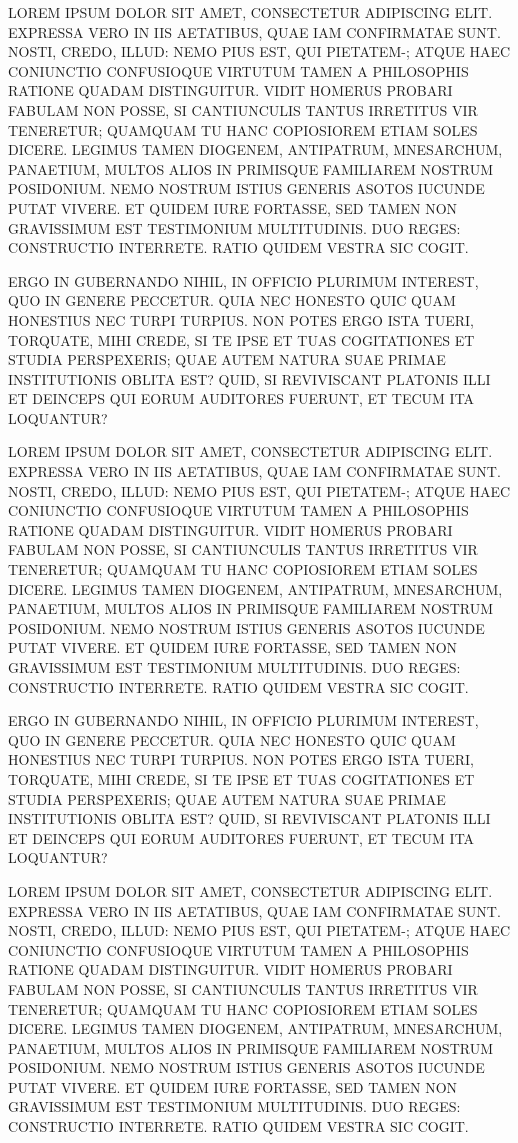 \documentclass[letterpaper]{article}
\begin{document}
LOREM IPSUM DOLOR SIT AMET, CONSECTETUR ADIPISCING ELIT. EXPRESSA VERO IN IIS AETATIBUS, QUAE IAM CONFIRMATAE SUNT. NOSTI, CREDO, ILLUD: NEMO PIUS EST, QUI PIETATEM-; ATQUE HAEC CONIUNCTIO CONFUSIOQUE VIRTUTUM TAMEN A PHILOSOPHIS RATIONE QUADAM DISTINGUITUR. VIDIT HOMERUS PROBARI FABULAM NON POSSE, SI CANTIUNCULIS TANTUS IRRETITUS VIR TENERETUR; QUAMQUAM TU HANC COPIOSIOREM ETIAM SOLES DICERE. LEGIMUS TAMEN DIOGENEM, ANTIPATRUM, MNESARCHUM, PANAETIUM, MULTOS ALIOS IN PRIMISQUE FAMILIAREM NOSTRUM POSIDONIUM. NEMO NOSTRUM ISTIUS GENERIS ASOTOS IUCUNDE PUTAT VIVERE. ET QUIDEM IURE FORTASSE, SED TAMEN NON GRAVISSIMUM EST TESTIMONIUM MULTITUDINIS. DUO REGES: CONSTRUCTIO INTERRETE. RATIO QUIDEM VESTRA SIC COGIT.

ERGO IN GUBERNANDO NIHIL, IN OFFICIO PLURIMUM INTEREST, QUO IN GENERE PECCETUR. QUIA NEC HONESTO QUIC QUAM HONESTIUS NEC TURPI TURPIUS. NON POTES ERGO ISTA TUERI, TORQUATE, MIHI CREDE, SI TE IPSE ET TUAS COGITATIONES ET STUDIA PERSPEXERIS; QUAE AUTEM NATURA SUAE PRIMAE INSTITUTIONIS OBLITA EST? QUID, SI REVIVISCANT PLATONIS ILLI ET DEINCEPS QUI EORUM AUDITORES FUERUNT, ET TECUM ITA LOQUANTUR?

LOREM IPSUM DOLOR SIT AMET, CONSECTETUR ADIPISCING ELIT. EXPRESSA VERO IN IIS AETATIBUS, QUAE IAM CONFIRMATAE SUNT. NOSTI, CREDO, ILLUD: NEMO PIUS EST, QUI PIETATEM-; ATQUE HAEC CONIUNCTIO CONFUSIOQUE VIRTUTUM TAMEN A PHILOSOPHIS RATIONE QUADAM DISTINGUITUR. VIDIT HOMERUS PROBARI FABULAM NON POSSE, SI CANTIUNCULIS TANTUS IRRETITUS VIR TENERETUR; QUAMQUAM TU HANC COPIOSIOREM ETIAM SOLES DICERE. LEGIMUS TAMEN DIOGENEM, ANTIPATRUM, MNESARCHUM, PANAETIUM, MULTOS ALIOS IN PRIMISQUE FAMILIAREM NOSTRUM POSIDONIUM. NEMO NOSTRUM ISTIUS GENERIS ASOTOS IUCUNDE PUTAT VIVERE. ET QUIDEM IURE FORTASSE, SED TAMEN NON GRAVISSIMUM EST TESTIMONIUM MULTITUDINIS. DUO REGES: CONSTRUCTIO INTERRETE. RATIO QUIDEM VESTRA SIC COGIT.

ERGO IN GUBERNANDO NIHIL, IN OFFICIO PLURIMUM INTEREST, QUO IN GENERE PECCETUR. QUIA NEC HONESTO QUIC QUAM HONESTIUS NEC TURPI TURPIUS. NON POTES ERGO ISTA TUERI, TORQUATE, MIHI CREDE, SI TE IPSE ET TUAS COGITATIONES ET STUDIA PERSPEXERIS; QUAE AUTEM NATURA SUAE PRIMAE INSTITUTIONIS OBLITA EST? QUID, SI REVIVISCANT PLATONIS ILLI ET DEINCEPS QUI EORUM AUDITORES FUERUNT, ET TECUM ITA LOQUANTUR?

LOREM IPSUM DOLOR SIT AMET, CONSECTETUR ADIPISCING ELIT. EXPRESSA VERO IN IIS AETATIBUS, QUAE IAM CONFIRMATAE SUNT. NOSTI, CREDO, ILLUD: NEMO PIUS EST, QUI PIETATEM-; ATQUE HAEC CONIUNCTIO CONFUSIOQUE VIRTUTUM TAMEN A PHILOSOPHIS RATIONE QUADAM DISTINGUITUR. VIDIT HOMERUS PROBARI FABULAM NON POSSE, SI CANTIUNCULIS TANTUS IRRETITUS VIR TENERETUR; QUAMQUAM TU HANC COPIOSIOREM ETIAM SOLES DICERE. LEGIMUS TAMEN DIOGENEM, ANTIPATRUM, MNESARCHUM, PANAETIUM, MULTOS ALIOS IN PRIMISQUE FAMILIAREM NOSTRUM POSIDONIUM. NEMO NOSTRUM ISTIUS GENERIS ASOTOS IUCUNDE PUTAT VIVERE. ET QUIDEM IURE FORTASSE, SED TAMEN NON GRAVISSIMUM EST TESTIMONIUM MULTITUDINIS. DUO REGES: CONSTRUCTIO INTERRETE. RATIO QUIDEM VESTRA SIC COGIT.
\end{document}
